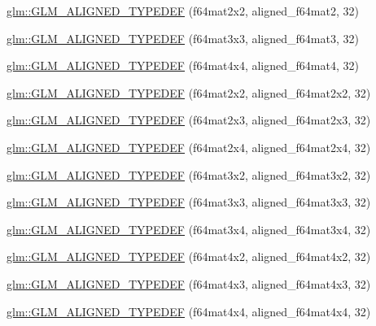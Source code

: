 \begin{DoxyCompactItemize}
\item 
\hyperlink{group__gtx__type__aligned_ga88f6c6fa06e6e64479763e69444669cf}{glm\-::\-G\-L\-M\-\_\-\-A\-L\-I\-G\-N\-E\-D\-\_\-\-T\-Y\-P\-E\-D\-E\-F} (f64mat2x2, aligned\-\_\-f64mat2, 32)
\item 
\hyperlink{group__gtx__type__aligned_gaae8e4639c991e64754145ab8e4c32083}{glm\-::\-G\-L\-M\-\_\-\-A\-L\-I\-G\-N\-E\-D\-\_\-\-T\-Y\-P\-E\-D\-E\-F} (f64mat3x3, aligned\-\_\-f64mat3, 32)
\item 
\hyperlink{group__gtx__type__aligned_ga6e9094f3feb3b5b49d0f83683a101fde}{glm\-::\-G\-L\-M\-\_\-\-A\-L\-I\-G\-N\-E\-D\-\_\-\-T\-Y\-P\-E\-D\-E\-F} (f64mat4x4, aligned\-\_\-f64mat4, 32)
\item 
\hyperlink{group__gtx__type__aligned_gadbd2c639c03de1c3e9591b5a39f65559}{glm\-::\-G\-L\-M\-\_\-\-A\-L\-I\-G\-N\-E\-D\-\_\-\-T\-Y\-P\-E\-D\-E\-F} (f64mat2x2, aligned\-\_\-f64mat2x2, 32)
\item 
\hyperlink{group__gtx__type__aligned_gab059d7b9fe2094acc563b7223987499f}{glm\-::\-G\-L\-M\-\_\-\-A\-L\-I\-G\-N\-E\-D\-\_\-\-T\-Y\-P\-E\-D\-E\-F} (f64mat2x3, aligned\-\_\-f64mat2x3, 32)
\item 
\hyperlink{group__gtx__type__aligned_gabbc811d1c52ed2b8cfcaff1378f75c69}{glm\-::\-G\-L\-M\-\_\-\-A\-L\-I\-G\-N\-E\-D\-\_\-\-T\-Y\-P\-E\-D\-E\-F} (f64mat2x4, aligned\-\_\-f64mat2x4, 32)
\item 
\hyperlink{group__gtx__type__aligned_ga9ddf5212777734d2fd841a84439f3bdf}{glm\-::\-G\-L\-M\-\_\-\-A\-L\-I\-G\-N\-E\-D\-\_\-\-T\-Y\-P\-E\-D\-E\-F} (f64mat3x2, aligned\-\_\-f64mat3x2, 32)
\item 
\hyperlink{group__gtx__type__aligned_gad1dda32ed09f94bfcf0a7d8edfb6cf13}{glm\-::\-G\-L\-M\-\_\-\-A\-L\-I\-G\-N\-E\-D\-\_\-\-T\-Y\-P\-E\-D\-E\-F} (f64mat3x3, aligned\-\_\-f64mat3x3, 32)
\item 
\hyperlink{group__gtx__type__aligned_ga5875e0fa72f07e271e7931811cbbf31a}{glm\-::\-G\-L\-M\-\_\-\-A\-L\-I\-G\-N\-E\-D\-\_\-\-T\-Y\-P\-E\-D\-E\-F} (f64mat3x4, aligned\-\_\-f64mat3x4, 32)
\item 
\hyperlink{group__gtx__type__aligned_ga41e82cd6ac07f912ba2a2d45799dcf0d}{glm\-::\-G\-L\-M\-\_\-\-A\-L\-I\-G\-N\-E\-D\-\_\-\-T\-Y\-P\-E\-D\-E\-F} (f64mat4x2, aligned\-\_\-f64mat4x2, 32)
\item 
\hyperlink{group__gtx__type__aligned_ga0892638d6ba773043b3d63d1d092622e}{glm\-::\-G\-L\-M\-\_\-\-A\-L\-I\-G\-N\-E\-D\-\_\-\-T\-Y\-P\-E\-D\-E\-F} (f64mat4x3, aligned\-\_\-f64mat4x3, 32)
\item 
\hyperlink{group__gtx__type__aligned_ga912a16432608b822f1e13607529934c1}{glm\-::\-G\-L\-M\-\_\-\-A\-L\-I\-G\-N\-E\-D\-\_\-\-T\-Y\-P\-E\-D\-E\-F} (f64mat4x4, aligned\-\_\-f64mat4x4, 32)

\end{DoxyCompactItemize}
